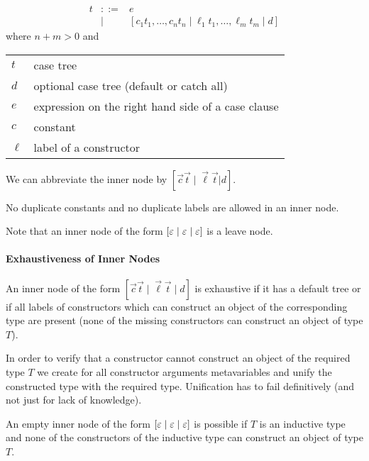 $$
    \begin{array}{lllll}
        t
        &::=& e
        \\
        &\mid& [
            c_1 t_1, \ldots,  c_n t_n \mid
            \ell_1 t_1, \ldots, \ell_m t_m
            \mid
            d
        ]
    \end{array}
$$
%
where $n + m > 0$ and
%
\begin{center}
    \begin{tabular}{l p{8cm}}
        $t$ & case tree
        \\
        $d$ & optional case tree (default or catch all)
        \\
        $e$ & expression on the right hand side of a case clause
        \\
        $c$ & constant
        \\
        $\ell$ & label of a constructor
    \end{tabular}
\end{center}

We can abbreviate the inner node by $[\vec c\vec t \mid \vec\ell \vec t | d]$.


No duplicate constants and no duplicate labels are allowed in an inner node.

Note that an inner node of the form $[\varepsilon \mid \varepsilon \mid \varepsilon]$ is
a leave node.



\paragraph{Exhaustiveness of Inner Nodes}
%

An inner node of the form $[\vec c \vec t \mid \vec\ell \vec t \mid d]$ is
exhaustive if it has a default tree or if all labels of constructors which can
construct an object of the corresponding type are present (none of the missing
constructors can construct an object of type $T$).

In order to verify that a constructor cannot construct an object of the required
type $T$ we create for all constructor arguments metavariables and unify the
constructed type with the required type. Unification has to fail definitively
(and not just for lack of knowledge).

An empty inner node of the form $[\varepsilon \mid \varepsilon \mid \varepsilon]$ is
possible if $T$ is an inductive type and none of the constructors of the
inductive type can construct an object of type $T$.


